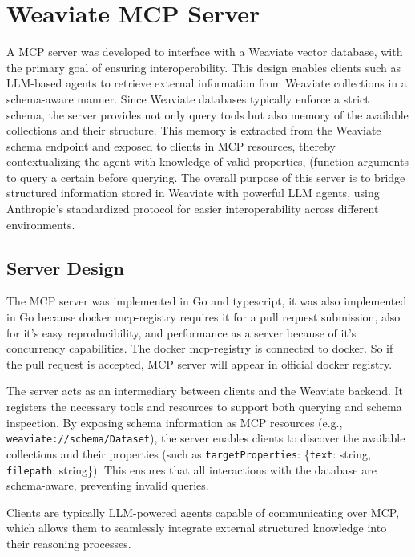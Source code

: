 \section{Weaviate MCP Server}

A \ac{MCP} \cite{mcp-architecture} server was developed to interface with a Weaviate vector database, with the primary goal of ensuring interoperability. This design enables clients such as \ac{LLM}-based agents to retrieve external information from Weaviate collections in a schema-aware manner. Since Weaviate databases typically enforce a strict schema, the server provides not only query tools but also memory of the available collections and their structure. This memory is extracted from the Weaviate schema endpoint and exposed to clients in
MCP resources, thereby contextualizing the agent with knowledge of valid properties, (function arguments to query a certain  before querying.  
The overall purpose of this server is to bridge structured information stored in Weaviate with powerful \ac{LLM} agents, using Anthropic’s standardized protocol for easier interoperability across different environments.

\subsection{Server Design}

The MCP server was implemented in Go and typescript, it was also implemented in Go because docker mcp-registry requires it for a pull request submission, also for it's easy reproducibility, and performance as a server because of it's concurrency capabilities. The docker mcp-registry is connected to docker. So if the pull request is accepted, MCP server will appear in official docker registry.

The server acts as an intermediary between clients and the Weaviate backend. It registers the necessary tools and resources to support both querying and schema inspection. By exposing schema information as MCP resources (e.g., \texttt{weaviate://schema/Dataset}), the server enables clients to discover the available collections and their properties (such as \texttt{targetProperties}: \{\texttt{text}: string, \texttt{filepath}: string\}). This ensures that all interactions with the database are schema-aware, preventing invalid queries.  

Clients are typically \ac{LLM}-powered agents capable of communicating over \ac{MCP}, which allows them to seamlessly integrate external structured knowledge into their reasoning processes.

